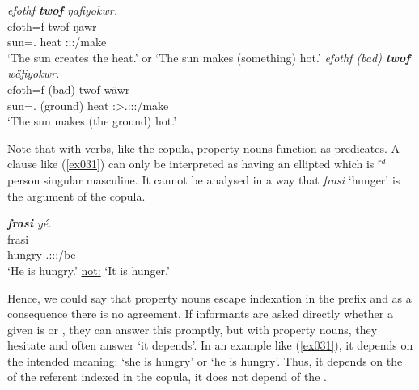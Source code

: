 \begin{exe}
	\ex \label{ex495}
	\begin{xlist}
	\ex \emph{efothf \textbf{twof} ŋafiyokwr.}\\
	\gll efoth=f twof ŋawr\\
	sun=\Erg.\Sg{} heat \Stsg:\Sbj:\Nonpast:\Ipfv/make\\
	\trans `The sun creates the heat.' or `The sun makes (something) hot.'
	\label{ex496}
	\ex \emph{efothf (bad) \textbf{twof} wäfiyokwr.}\\
	\gll efoth=f (bad) twof wäwr\\
	sun=\Erg.\Sg{} (ground) heat \Stsg:\Sbj>\Tsg.\F:\Obj:\Nonpast:\Ipfv/make\\
	\trans `The sun makes (the ground) hot.'
	\label{ex497}
	\end{xlist}
\end{exe}

Note that with  verbs, like the copula, property nouns function as  predicates. A clause like (\ref{ex031}) can only be interpreted as having an ellipted  which is \Third{}$^{rd}$ person singular masculine. It cannot be analysed in a way that \emph{frasi} `hunger' is the argument of the copula.

\begin{exe}
	\ex \emph{\textbf{frasi} yé.}\\
	\gll frasi \\
	hungry \Tsg{}.\Masc:\Sbj:\Nonpast:\Ipfv/be\\
	\trans `He is hungry.' \underline{not:} `It is hunger.'
	\label{ex031}
\end{exe}

Hence, we could say that property nouns escape indexation in the  prefix and as a consequence there is no  agreement. If informants are asked directly whether a given  is  or , they can answer this promptly, but with property nouns, they hesitate and often answer `it depends'. In an example like (\ref{ex031}), it depends on the intended meaning: `she is hungry' or `he is hungry'. Thus, it depends on the  of the referent indexed in the copula, it does not depend of the .\\


